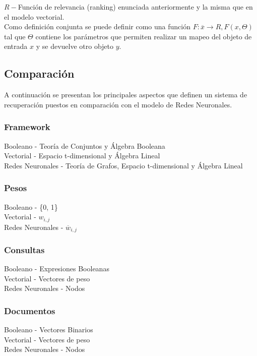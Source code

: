 \documentclass{llncs}
\begin{document}
{$R -$Funci\'on de relevancia (ranking) enuncia\-da anteriormente y la misma que en el modelo vectorial.\\

Como definici\'on conjunta se puede definir como una funci\'on $F:\overline{x} \rightarrow R, F(x, \Theta)$ tal que $\Theta$ contiene los par\'ametros
que permiten realizar un mapeo del objeto de entrada $x$ y se devuelve otro objeto $y$.\\

\subsection{Comparaci\'on}

A continuaci\'on se presentan los principales aspectos que definen un sistema de recuperaci\'on puestos en comparaci\'on con el modelo de Redes Neuronales.\\

\subsubsection{Framework}
Booleano - Teor\'ia de Conjuntos y \'Algebra Booleana \\
Vectorial - Espacio t-dimensional y \'Algebra Lineal \\
Redes Neuronales - Teor\'ia de Grafos, Espacio t-dimensional y \'Algebra Lineal

\subsubsection{Pesos}
Booleano - \{0, 1\} \\
Vectorial - $w_{i,j}$ \\
Redes Neuronales - $\overline{w}_{i, j}$

\subsubsection{Consultas}
Booleano -  Expresiones Booleanas \\
Vectorial - Vectores de peso \\
Redes Neuronales - Nodos

\subsubsection{Documentos}
Booleano -  Vectores Binarios \\
Vectorial - Vectores de peso \\
Redes Neuronales - Nodos

}
\end{document}
